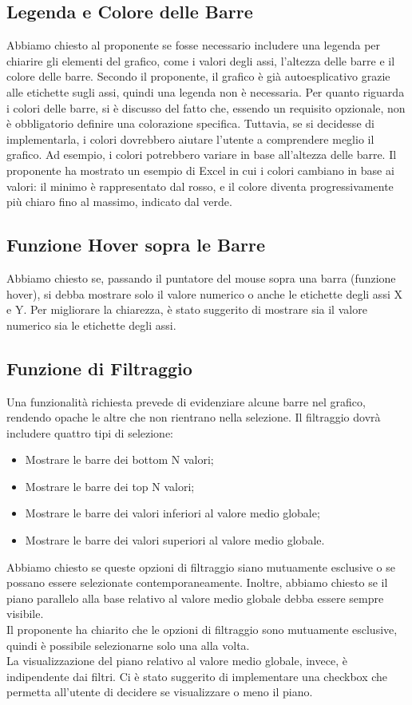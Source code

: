 \subsection{Legenda e Colore delle Barre}
Abbiamo chiesto al proponente se fosse necessario includere una legenda per chiarire gli elementi del grafico, come i valori degli assi, l'altezza delle barre e il colore delle barre.
Secondo il proponente, il grafico è già autoesplicativo grazie alle etichette sugli assi, quindi una legenda non è necessaria.
Per quanto riguarda i colori delle barre, si è discusso del fatto che, essendo un requisito opzionale, non è obbligatorio definire una colorazione specifica. 
Tuttavia, se si decidesse di implementarla, i colori dovrebbero aiutare l'utente a comprendere meglio il grafico. 
Ad esempio, i colori potrebbero variare in base all'altezza delle barre.
Il proponente ha mostrato un esempio di Excel in cui i colori cambiano in base ai valori: il minimo è rappresentato dal rosso, e il colore diventa progressivamente più chiaro fino al massimo, indicato dal verde.

\subsection{Funzione Hover sopra le Barre}
Abbiamo chiesto se, passando il puntatore del mouse sopra una barra (funzione hover), si debba mostrare solo il valore numerico o anche le etichette degli assi X e Y.
Per migliorare la chiarezza, è stato suggerito di mostrare sia il valore numerico sia le etichette degli assi.

\subsection{Funzione di Filtraggio}
Una funzionalità richiesta prevede di evidenziare alcune barre nel grafico, rendendo opache le altre che non rientrano nella selezione. 
Il filtraggio dovrà includere quattro tipi di selezione:
\begin{itemize} 
    \item Mostrare le barre dei bottom N valori;
    \item Mostrare le barre dei top N valori;
    \item Mostrare le barre dei valori inferiori al valore medio globale;
    \item Mostrare le barre dei valori superiori al valore medio globale. 
\end{itemize}
Abbiamo chiesto se queste opzioni di filtraggio siano mutuamente esclusive o se possano essere selezionate contemporaneamente. 
Inoltre, abbiamo chiesto se il piano parallelo alla base relativo al valore medio globale debba essere sempre visibile.\\
Il proponente ha chiarito che le opzioni di filtraggio sono mutuamente esclusive, quindi è possibile selezionarne solo una alla volta.\\ 
La visualizzazione del piano relativo al valore medio globale, invece, è indipendente dai filtri. 
Ci è stato suggerito di implementare una checkbox che permetta all'utente di decidere se visualizzare o meno il piano.

